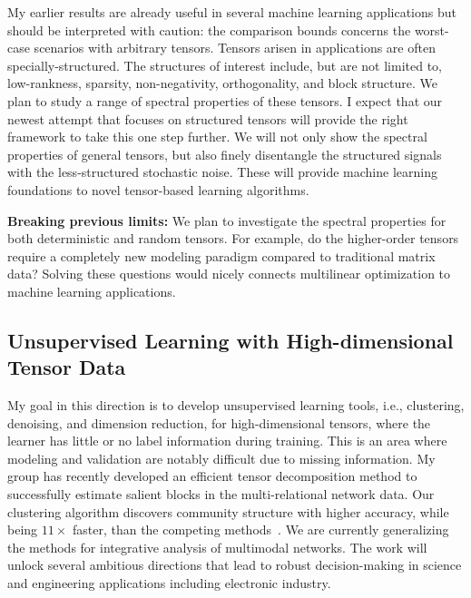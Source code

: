 \documentclass[10pt]{article}
\DeclareRobustCommand{\mybox}[2][gray!20]{%
\begin{tcolorbox}[   %
        breakable,
        left=0pt,
        right=0pt,
        top=0pt,
        bottom=0pt,
        colback=#1,
        colframe=#1,
        width=\dimexpr\textwidth\relax, 
        enlarge left by=0mm,
        boxsep=5pt,
        arc=0pt,outer arc=0pt,
        ]
        #2
\end{tcolorbox}
}
\DeclareRobustCommand{\mybox}[2][gray!20]{%
\begin{tcolorbox}[   %
        breakable,
        left=0pt,
        right=0pt,
        top=0pt,
        bottom=0pt,
        colback=#1,
        colframe=#1,
        width=\dimexpr\textwidth\relax, 
        enlarge left by=0mm,
        boxsep=5pt,
        arc=0pt,outer arc=0pt,
        ]
        #2
\end{tcolorbox}
}
\theoremstyle{definition}
\theoremstyle{definition}
\theoremstyle{definition}
\begin{document}
My earlier results are already useful in several machine learning applications but should be interpreted with caution: the comparison bounds concerns the worst-case scenarios with arbitrary tensors. Tensors arisen in applications are often specially-structured. The structures of interest include, but are not limited to, low-rankness, sparsity, non-negativity, orthogonality, and block structure. We plan to study a range of spectral properties of these tensors. I expect that our newest attempt that focuses on structured tensors will provide the right framework to take this one step further. We will not only show the spectral properties of general tensors, but also finely disentangle the structured signals with the less-structured stochastic noise. These will provide machine learning foundations to novel tensor-based learning algorithms. 


\mybox[gray!20]{{\bf Breaking previous limits:} We plan to investigate the spectral properties for both deterministic and random tensors. For example, do the higher-order tensors require a completely new modeling paradigm compared to traditional matrix data? Solving these questions would nicely connects multilinear optimization to machine learning applications.}


\subsection{Unsupervised Learning with High-dimensional Tensor Data}\label{sec:aim2}
My goal in this direction is to develop unsupervised learning tools, i.e., clustering, denoising, and dimension reduction, for high-dimensional tensors, where the learner has little or no label information during training. This is an area where modeling and validation are notably difficult due to missing information. My group has recently developed an efficient tensor decomposition method to successfully estimate salient blocks in the multi-relational network data. Our clustering algorithm discovers community structure with higher accuracy, while being $11\times$ faster, than the competing methods~\cite{wang2019three,zeng2019multiway,wang2018learning}. We are currently generalizing the methods for integrative analysis of multimodal networks. The work will unlock several ambitious directions that lead to robust decision-making in science and engineering applications including electronic industry.  
\end{document}
